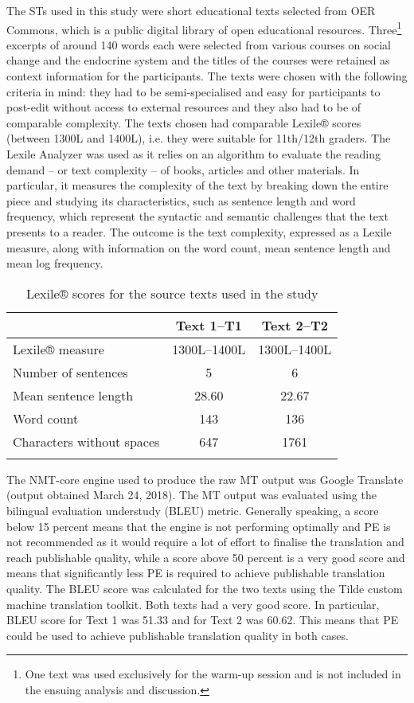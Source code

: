 \documentclass[output=paper]{langscibook}
\begin{document}
The STs used in this study were short educational texts selected from OER Commons, which is a public digital library of open educational resources. Three\footnote{One text was used exclusively for the warm-up session and is not included in the ensuing analysis and discussion.} excerpts of around 140 words each were selected from various courses on social change and the endocrine system and the titles of the courses were retained as context information for the participants. The texts were chosen with the following criteria in mind: they had to be semi-specialised and easy for participants to post-edit without access to external resources and they also had to be of comparable complexity. The texts chosen had comparable Lexile® scores (between 1300L and 1400L), i.e. they were suitable for 11th/12th graders. The Lexile Analyzer was used as it relies on an algorithm to evaluate the reading demand -- or text complexity -- of books, articles and other materials. In particular, it measures the complexity of the text by breaking down the entire piece and studying its characteristics, such as sentence length and word frequency, which represent the syntactic and semantic challenges that the text presents to a reader. The outcome is the text complexity, expressed as a Lexile measure, along with information on the word count, mean sentence length and mean log frequency.

\begin{table}
\caption{Lexile® scores for the source texts used in the study}
\label{tab:1:Lexile® scores for the source texts used in the study}
 \begin{tabularx}{.8\textwidth}{Xcc}
  \lsptoprule
    & Text 1--T1 & Text 2--T2\\ 
  \midrule
  Lexile® measure & 1300L--1400L   & 1300L--1400L  \\
  Number of sentences & 5  & 6\\
  Mean sentence length & 28.60  & 22.67\\
  Word count   &  143  &    136\\
  Characters without spaces   &  647  &1761\\
  \lspbottomrule
 \end{tabularx}
\end{table}


The NMT-core engine used to produce the raw MT output was Google Translate (output obtained March 24, 2018). The MT output was evaluated using the bilingual evaluation understudy (BLEU) metric. Generally speaking, a score below 15 percent means that the engine is not performing optimally and PE is not recommended as it would require a lot of effort to finalise the translation and reach publishable quality, while a score above 50 percent is a very good score and means that significantly less PE is required to achieve publishable translation quality. The BLEU score was calculated for the two texts using the Tilde custom machine translation toolkit. Both texts had a very good score. In particular, BLEU score for Text 1 was 51.33 and for Text 2 was 60.62. This means that PE could be used to achieve publishable translation quality in both cases.
\end{document}
